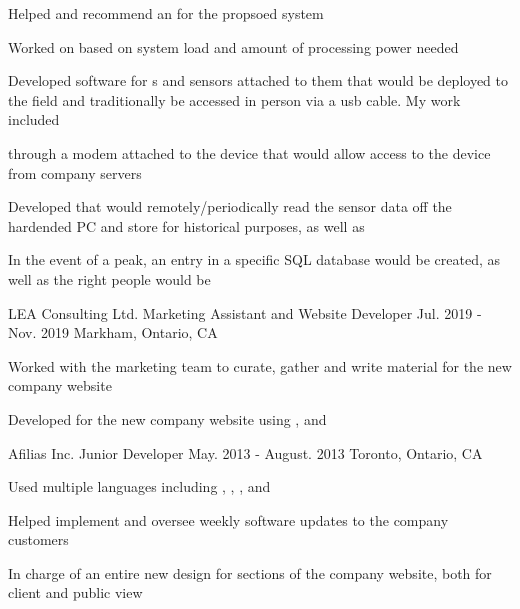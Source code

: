 \begin{cventries}
{\begin{cvitems}
        \begin{cvsubitems}
          \item {Helped  and recommend an  for the propsoed system}
          \item {Worked on  based on system load and amount of processing power needed}
        \end{cvsubitems}
      \item {Developed software for s and sensors attached to them that would be deployed to the field and traditionally be accessed in person via a usb cable. My work included}
        \begin{cvsubitems}
          \item { through a modem attached to the device that would allow  access to the device from company servers}
          \item {Developed  that would remotely/periodically read the sensor data off the hardended PC and store for historical purposes, as well as }
          \item {In the event of a peak, an entry in a specific SQL database would be created, as well as the right people would be }
        \end{cvsubitems}
    \end{cvitems}
  }
\cventry
{LEA Consulting Ltd.} %
{Marketing Assistant and Website Developer} %
{Jul. 2019 - Nov. 2019} %
{Markham, Ontario, CA} %
{
  \begin{cvitems} %
    \item {Worked with the marketing team to curate, gather and write material for the new company website}
    \item {Developed  for the new company website using ,  and }
  \end{cvitems}
}

\cventry
{Afilias Inc.} %
{Junior Developer} %
{May. 2013 - August. 2013} %
{Toronto, Ontario, CA} %
{
  \begin{cvitems} %
    \item {Used multiple languages including , , ,  and }
    \item {Helped implement and oversee weekly software updates to the company customers}
    \item {In charge of an entire new design for sections of the company website, both for client and public view}
  \end{cvitems}
}

\end{cventries}
